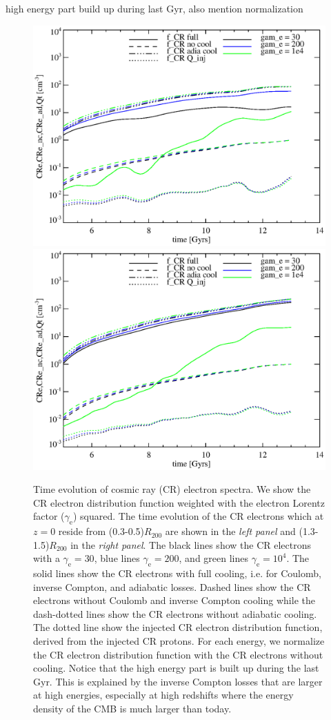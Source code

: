\documentclass[useAMS,usenatbib]{mn2e}
\newcommand{\e}{\mathrm{e}}
\newcommand{\rvir}{R_{200}}
\begin{document}
high energy part build up during last Gyr, also mention normalization
\begin{figure}
\begin{minipage}{2.0\columnwidth}
  \includegraphics[width=0.49\columnwidth]{./figures/f_evolution.0.3Rv.eps}
  \includegraphics[width=0.49\columnwidth]{./figures/f_evolution.1.4Rv.eps}
  \caption{Time evolution of cosmic ray (CR) electron spectra. We show
    the CR electron distribution function weighted with the electron
    Lorentz factor ($\gamma_\e$) squared. The time evolution of the CR
    electrons which at $z=0$ reside from (0.3-0.5)$\rvir$ are shown in
    the {\it left panel} and (1.3-1.5)$\rvir$ in the {\it right
      panel}. The black lines show the CR electrons with a
    $\gamma_\e=30$, blue lines $\gamma_\e=200$, and green lines
    $\gamma_\e=10^4$. The solid lines show the CR electrons with full
    cooling, i.e. for Coulomb, inverse Compton, and adiabatic
    losses. Dashed lines show the CR electrons without Coulomb and
    inverse Compton cooling while the dash-dotted lines show the CR
    electrons without adiabatic cooling. The dotted line show the
    injected CR electron distribution function, derived from the
    injected CR protons. For each energy, we normalize the CR electron
    distribution function with the CR electrons without
    cooling. Notice that the high energy part is built up during the
    last Gyr. This is explained by the inverse Compton losses that are
    larger at high energies, especially at high redshifts where the
    energy density of the CMB is much larger than
    today.  \label{fig:e_evol}}
\end{minipage}
\end{figure}
\end{document}
